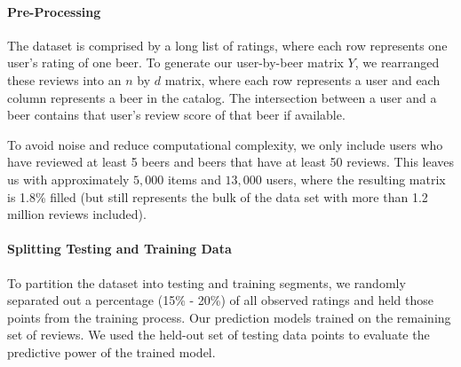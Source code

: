 \documentclass[12pt]{article}
\begin{document}

\paragraph{Pre-Processing}
The dataset is comprised by a long list of ratings, where each row represents one user's rating of one beer. To generate our user-by-beer matrix $Y$, we rearranged these reviews into an $n$ by $d$ matrix, where each row represents a user and each column represents a beer in the catalog. The intersection between a user and a beer contains that user's review score of that beer if available.

To avoid noise and reduce computational complexity, we only include users who have reviewed at least 5 beers and beers that have at least 50 reviews. This leaves us with approximately $5,000$ items and $13,000$ users, where the resulting matrix is 1.8\% filled (but still represents the bulk of the data set with more than 1.2 million reviews included).





\paragraph{Splitting Testing and Training Data} To partition the dataset into testing and training segments, we randomly separated out a percentage (15\% - 20\%) of all observed ratings and held those points from the training process. Our prediction models trained on the remaining set of reviews. We used the held-out set of testing data points to evaluate the predictive power of the trained model.
\end{document}
